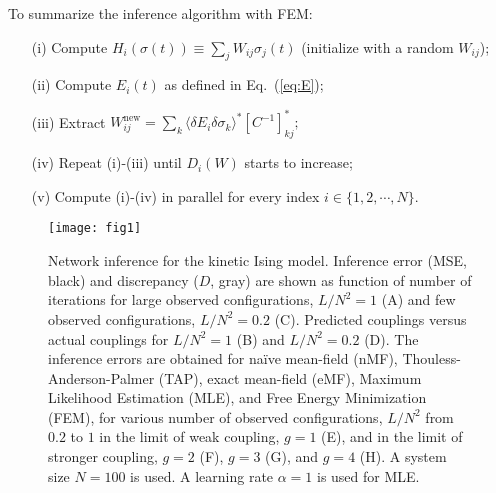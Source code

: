 \documentclass[prx,twocolumn,twoside,showpacs,superscriptaddress]{revtex4-1}
\begin{document}
To summarize the inference algorithm with FEM: %
\begin{enumerate}
\item[(i)] Compute $H_i(\sigma(t)) \equiv \sum_j W_{ij} \sigma_j (t)$ (initialize with a random $W_{ij}$);
\item[(ii)] Compute $E_i(t)$ as defined in Eq.~(\ref{eq:E});
\item[(iii)] Extract $W_{ij}^{\textrm{new}}= \sum_k \langle \delta E_i \delta \sigma_k  \rangle^{*} [C^{-1}]^*_{kj};$ %
\item[(iv)] Repeat (i)-(iii) until $D_i(W)$ starts to increase;
\item[(v)] Compute (i)-(iv) in parallel for every index $i \in \{1, 2, \cdots, N\}$.
\end{enumerate}

\begin{figure*}
\centering
\texttt{[image: fig1]}
\caption{ \label{fig:fig1}Network inference for the kinetic Ising model. Inference error (MSE, black) and discrepancy ($D$, gray) are shown as function of number of iterations for large observed configurations, $L/N^2=1$ (A) and few observed configurations, $L/N^2=0.2$ (C). Predicted couplings versus actual couplings for $L/N^2=1$ (B) and $L/N^2=0.2$ (D). The inference errors are obtained for na\"ive mean-field (nMF), Thouless-Anderson-Palmer (TAP), exact mean-field (eMF), Maximum Likelihood Estimation (MLE), and Free Energy Minimization (FEM), for various number of observed configurations, $L/N^2$ from $0.2$ to $1$ in the limit of weak coupling, $g=1$ (E), and in the limit of stronger coupling, $g=2$ (F), $g=3$ (G), and $g=4$ (H). A system size $N=100$ is used. A learning rate $\alpha=1$ is used for MLE.
}
\end{figure*}
\end{document}

